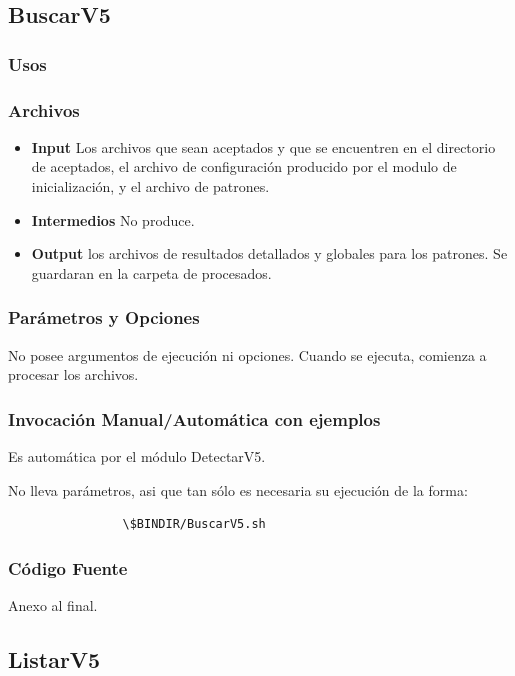 \documentclass[a4paper,10pt,titlepage]{article}
\begin{document}
	\subsection{BuscarV5}
		\subsubsection{Usos}
			 

		\subsubsection{Archivos}
			\begin {itemize}
				\item \textbf{Input} {Los archivos que sean aceptados y que se encuentren en el directorio de aceptados, el archivo de configuración producido por el modulo de inicialización, y el archivo de patrones.}
				\item \textbf{Intermedios} {No produce.}
				\item \textbf{Output} {los archivos de resultados detallados y globales para los patrones. Se guardaran en la carpeta de procesados.}
			\end{itemize}

		\subsubsection{Par\'ametros y Opciones}
			 No posee argumentos de ejecución ni opciones. Cuando se ejecuta, comienza a procesar los archivos.
	
		\subsubsection{Invocaci\'on Manual/Autom\'atica con ejemplos}
Es automática por el módulo DetectarV5. 

No lleva parámetros, asi que tan sólo es necesaria su ejecución de la forma:
			\begin{verbatim}
				\$BINDIR/BuscarV5.sh
			\end{verbatim}

		\subsubsection{C\'odigo Fuente}
			Anexo al final.

	\subsection{ListarV5}
\end{document}
